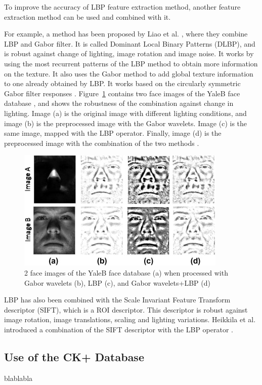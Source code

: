 \vspace{\baselineskip}
\noindent To improve the accuracy of LBP feature extraction method, another feature extraction method can be used and combined with it. 
\newline

\noindent  For example, a method has been proposed by Liao et al. \cite{LIA09}, where they combine LBP and Gabor filter. It is called Dominant Local Binary Patterns (DLBP), and is robust against change of lighting, image rotation and image noise.  It works by using the most recurrent patterns of the LBP method to obtain more information on the texture. It also uses the Gabor method to add global texture information to one already obtained by LBP. It works based on the circularly symmetric Gabor filter responses \cite{LIA09}. Figure~\ref{combination_lbp_gabor} contains two face images of the YaleB face database , and shows the robustness of the combination against change in lighting. Image (a) is the original image with different lighting conditions, and image (b) is the preprocessed image with the Gabor wavelets. Image (c) is the same image, mapped with the LBP operator. Finally, image (d) is the preprocessed image with the combination of the two methods \cite{GOH11}.
\newline

\begin{figure}[!h]
\begin{center}
\noindent \includegraphics[scale=1]{figures/combination_lbp_gabor} 
\newline

\caption{2 face images of the YaleB face database (a) when processed with Gabor wavelets (b), LBP (c), and Gabor wavelets+LBP (d)\cite{GOH11}}
\label{combination_lbp_gabor}
\end{center} 
\end{figure}

\noindent  LBP has also been combined with the Scale Invariant Feature Transform descriptor (SIFT), which is a ROI descriptor. This descriptor is robust against image rotation, image translations, scaling and lighting variations. Heikkila et al. introduced a combination of the SIFT descriptor with the LBP operator \cite{HEI09}.
\newline

\subsection{Use of the CK+ Database}

\vspace{\baselineskip}
\noindent blablabla
\newline

